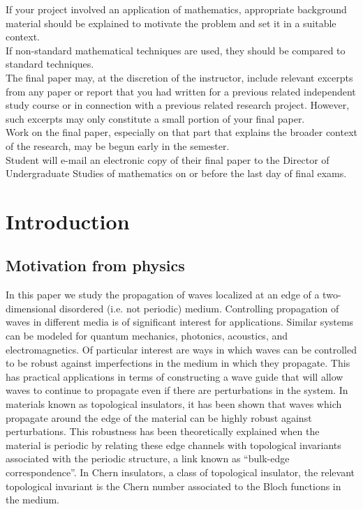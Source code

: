 \documentclass[a4paper]{article}
\begin{document}
If your project involved an application of mathematics, appropriate background material should be explained to motivate the problem and set it in a suitable context. \\

If non-standard mathematical techniques are used, they should be compared to standard techniques. \\

The final paper may, at the discretion of the instructor, include relevant excerpts from any paper or report that you had written for a previous related independent study course or in connection with a previous related research project. However, such excerpts may only constitute a small portion of your final paper. \\

Work on the final paper, especially on that part that explains the broader context of the research, may be begun early in the semester. \\

Student will e-mail an electronic copy of their final paper to the Director of Undergraduate Studies of mathematics on or before the last day of final exams. \\

\newpage

\maketitle

\section{Introduction}

\subsection{Motivation from physics}

In this paper we study the propagation of waves localized at an edge of a two-dimensional disordered (i.e. not periodic) medium. Controlling propagation of waves in different media is of significant interest for applications. Similar systems can be modeled for quantum mechanics, photonics, acoustics, and electromagnetics. Of particular interest are ways in which waves can be controlled to be robust against imperfections in the medium in which they propagate. This has practical applications in terms of constructing a wave guide that will allow waves to continue to propagate even if there are perturbations in the system. In materials known as topological insulators, it has been shown that waves which propagate around the edge of the material can be highly robust against perturbations. This robustness has been theoretically explained when the material is periodic by relating these edge channels with topological invariants associated with the periodic structure, a link known as ``bulk-edge correspondence''. In Chern insulators, a class of topological insulator, the relevant topological invariant is the Chern number associated to the Bloch functions in the medium.
\end{document}
